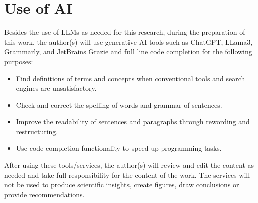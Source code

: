 \section{Use of AI}
\label{sec:use-of-ai}

Besides the use of LLMs as needed for this research, during the preparation of this work, the author(s) will use
generative AI tools such as ChatGPT, LLama3, Grammarly, and JetBrains Grazie and full line code completion for the
following purposes:

\begin{itemize}
    \item Find definitions of terms and concepts when conventional tools and search engines are unsatisfactory.
    \item Check and correct the spelling of words and grammar of sentences.
    \item Improve the readability of sentences and paragraphs through rewording and restructuring.
    \item Use code completion functionality to speed up programming tasks.
\end{itemize}

After using these tools/services, the author(s) will review and edit the content as needed and take full
responsibility for the content of the work.
The services will not be used to produce scientific insights, create figures, draw conclusions or provide
recommendations.